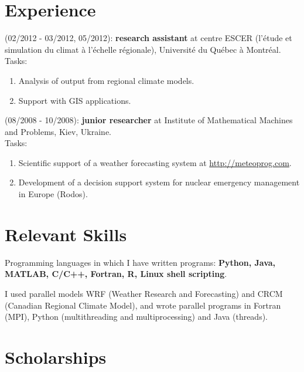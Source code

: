 \documentclass[letterpaper]{article}
\renewenvironment{itemize}{
  \begin{list}{}{
    \setlength{\leftmargin}{0em}
  }
}{
  \end{list}
}
\begin{document}
\section*{Experience}
\begin{itemize}
  
  \item (02/2012 - 03/2012, 05/2012):
  \textbf{research assistant} at centre ESCER (l'étude et simulation du climat à
  l'échelle régionale), Université du Québec à Montréal.\\
  Tasks:
  \begin{enumerate}
    \item Analysis of output from regional climate models.
    \item Support with GIS applications.
  \end{enumerate}

  \item (08/2008 - 10/2008): 
   \textbf{junior researcher} at Institute of Mathematical
  Machines and Problems, Kiev, Ukraine. \\
  Tasks:
  \begin{enumerate}
    \item Scientific support of a weather forecasting system at
    \href{http://meteoprog.com}{http://meteoprog.com}.
    \item Development of a decision support system for nuclear emergency
    management in Europe (Rodos).
  \end{enumerate}
\end{itemize}

\section*{Relevant Skills}
\begin{itemize}  
  \item Programming languages in which I have written programs: \textbf{ Python,
  Java, MATLAB, C/C++, Fortran, R, Linux shell scripting}. 
  \item I used parallel models WRF (Weather Research and Forecasting) and CRCM
  (Canadian Regional Climate Model), and wrote parallel programs in Fortran
  (MPI), Python (multithreading and multiprocessing) and Java (threads).
\end{itemize}


\section*{Scholarships}
\end{document}
